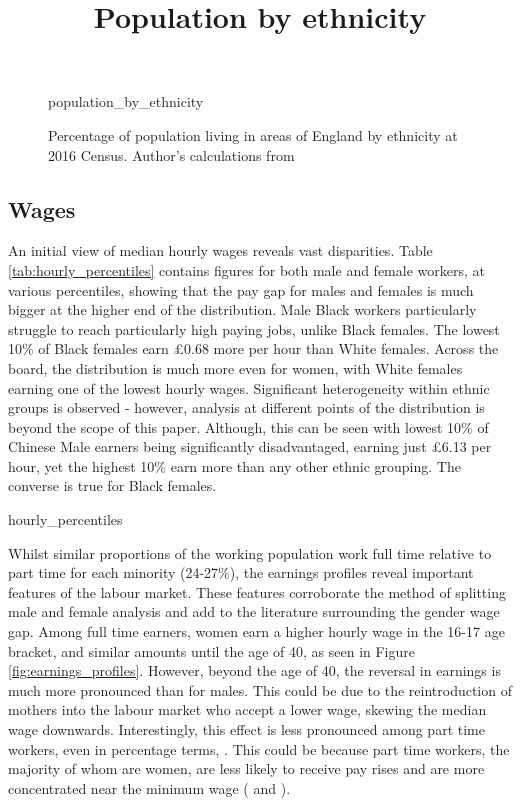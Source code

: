 \documentclass[class=article, crop=false]{standalone}
\begin{document}
\begin{figure}[]
\centering
    \title{Population by ethnicity}
    {population_by_ethnicity}
    \caption{Percentage of population living in areas of England by ethnicity at 2016 Census. Author's calculations from \citep{ONSd}}
    \label{fig:population_by_ethnicity}
\end{figure}

\subsection{Wages}
\label{sec:Wages}
An initial view of median hourly wages reveals vast disparities. Table \ref{tab:hourly_percentiles} contains figures for both male and female workers, at various percentiles, showing that the pay gap for males and females is much bigger at the higher end of the distribution. Male Black workers particularly struggle to reach particularly high paying jobs, unlike Black females. The lowest 10\% of Black females earn £0.68 more per hour than White females. Across the board, the distribution is much more even for women, with White females earning one of the lowest hourly wages. Significant heterogeneity within ethnic groups is observed - however, analysis at different points of the distribution is beyond the scope of this paper. Although, this can be seen with lowest 10\% of Chinese Male earners being significantly disadvantaged, earning just £6.13 per hour, yet the highest 10\% earn more than any other ethnic grouping. The converse is true for Black females. 

{hourly_percentiles}

Whilst similar proportions of the working population work full time relative to part time for each minority (24-27\%), the earnings profiles reveal important features of the labour market. These features corroborate the method of splitting male and female analysis and add to the literature surrounding the gender wage gap. Among full time earners, women earn a higher hourly wage in the 16-17 age bracket, and similar amounts until the age of 40, as seen in Figure \ref{fig:earnings_profiles}. However, beyond the age of 40, the reversal in earnings is much more pronounced than for males. This could be due to the reintroduction of mothers into the labour market who accept a lower wage, skewing the median wage downwards. Interestingly, this effect is less pronounced among part time workers, even in percentage terms, . This could be because part time workers, the majority of whom are women, are less likely to receive pay rises and are more concentrated near the minimum wage (\citet{IFS} and \citet{ONSi}).
\end{document}
